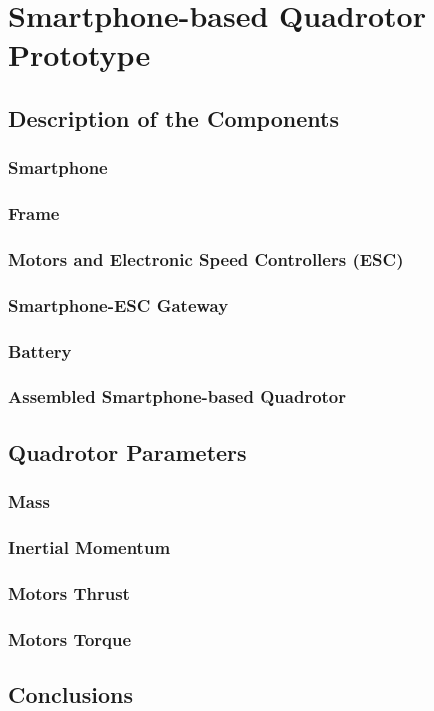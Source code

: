 \chapter{Smartphone-based Quadrotor Prototype} \label{ch:prototype}


\section{Description of the Components}


\subsection{Smartphone}


\subsection{Frame}

\subsection{Motors and Electronic Speed Controllers (ESC)}


\subsection{Smartphone-ESC Gateway}


\subsection{Battery}


\subsection{Assembled Smartphone-based Quadrotor}

\section{Quadrotor Parameters}

\subsection{Mass}


\subsection{Inertial Momentum}


\subsection{Motors Thrust}


\subsection{Motors Torque}


\section{Conclusions}